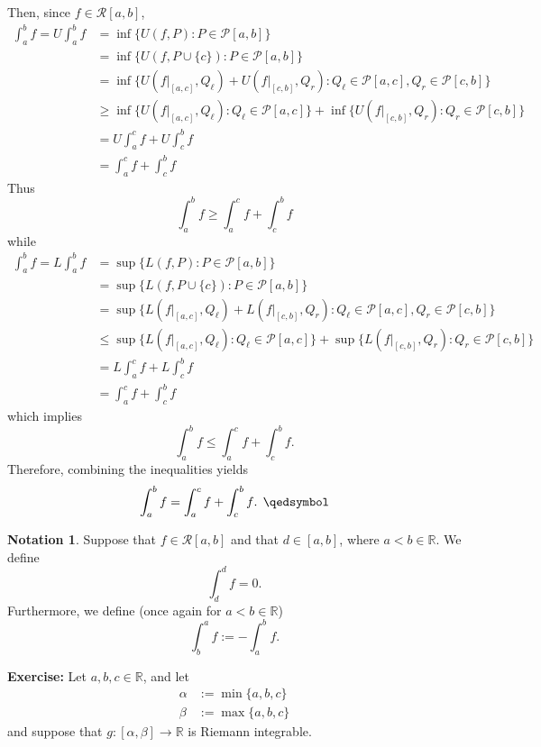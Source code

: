 \documentclass[11pt]{article}
\theoremstyle{definition}
\newtheorem{notation}[thm]{Notation}
\newcommand{\mbR}{\ensuremath{\mathbb{R}}}
\begin{document}
Then, since $f \in \mathcal{R}[a, b]$,
\begin{align*}
\int_a^b f = U\int_a^b f & = \inf\{U(f, P) : P \in \mathcal{P}[a, b]\} \\
					    & = \inf\{U(f, P \cup \{c\}) : P \in \mathcal{P}[a, b]\} \\
					    & = \inf\{U(f|_{[a, c]}, Q_{\ell}) + U(f|_{[c, b]}, Q_r) : Q_{\ell} \in \mathcal{P}[a, c], Q_r \in \mathcal{P}[c, b]\} \\
					    & \geq \inf\{U(f|_{[a, c]}, Q_{\ell}) : Q_{\ell} \in \mathcal{P}[a, c]\} + \inf\{U(f|_{[c, b]}, Q_r) : Q_r \in \mathcal{P}[c, b]\} \\
					    & = U\int_a^c f + U\int_c^b f \\
					    & = \int_a^c f + \int_c^b f
\end{align*}
Thus
$$\int_a^b f \geq \int_a^c f + \int_c^b f$$
while
\begin{align*}
\int_a^b f = L\int_a^b f & = \sup\{L(f, P) : P \in \mathcal{P}[a, b]\} \\
					    & = \sup\{L(f, P \cup \{c\}) : P \in \mathcal{P}[a, b]\} \\
					    & = \sup\{L(f|_{[a, c]}, Q_{\ell}) + L(f|_{[c, b]}, Q_r) : Q_{\ell} \in \mathcal{P}[a, c], Q_r \in \mathcal{P}[c, b]\} \\
					    & \leq \sup\{L(f|_{[a, c]}, Q_{\ell}) : Q_{\ell} \in \mathcal{P}[a, c]\} + \sup\{L(f|_{[c, b]}, Q_r) : Q_r \in \mathcal{P}[c, b]\} \\
					    & = L\int_a^c f + L\int_c^b f \\
					    & = \int_a^c f + \int_c^b f
\end{align*}
which implies
$$\int_a^b f \leq \int_a^c f + \int_c^b f \text{.}$$
Therefore, combining the inequalities yields
$$\int_a^b f = \int_a^c f + \int_c^b f \text{. } \qedsymbol$$

\begin{notation}
Suppose that $f \in \mathcal{R}[a, b]$ and that $d \in [a, b]$, where $a < b \in \mbR$. We define
$$\int_d^d f = 0 \text{.}$$
Furthermore, we define (once again for $a < b \in \mbR$)
$$\int_b^a f := - \int_a^b f \text{.}$$
\end{notation}
\textbf{Exercise:} Let $a, b, c \in \mbR$, and let
\begin{align*}
\alpha & := \min\{a, b, c\} \\
\beta & := \max\{a, b, c\}
\end{align*}
and suppose that $g : [\alpha, \beta] \to \mbR$ is Riemann integrable. 
\end{document}
